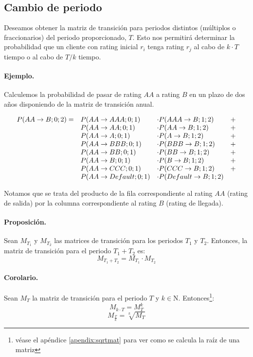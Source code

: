 \subsection{Cambio de periodo}
\label{mtrans:perchange}

Deseamos obtener la matriz de transici\'on para periodos distintos (m\'ultiplos o 
fraccionarios) del periodo proporcionado, $T$. Esto nos permitir\'a determinar la 
probabilidad que un cliente con rating inicial $r_i$ tenga rating $r_j$ al cabo 
de $k \cdot T$ tiempo o al cabo de $T/k$ tiempo.

\paragraph{Ejemplo.} Calculemos la probabilidad de pasar de rating $AA$ a
rating $B$ en un plazo de dos a\~nos disponiendo de la matriz de transici\'on anual.

\begin{displaymath}
\begin{array}{llll}
P(AA \to B;0;2) = & P(AA \to AAA;0;1)     & \cdot P(AAA \to B;1;2)     & + \cr
                  & P(AA \to AA;0;1)      & \cdot P(AA \to B;1;2)      & + \cr
                  & P(AA \to A;0;1)       & \cdot P(A \to B;1;2)       & + \cr
                  & P(AA \to BBB;0;1)     & \cdot P(BBB \to B;1;2)     & + \cr
                  & P(AA \to BB;0;1)      & \cdot P(BB \to B;1;2)      & + \cr
                  & P(AA \to B;0;1)       & \cdot P(B \to B;1;2)       & + \cr
                  & P(AA \to CCC;0;1)     & \cdot P(CCC \to B;1;2)     & + \cr
                  & P(AA \to Default;0;1) & \cdot P(Default \to B;1;2) &
\end{array}
\end{displaymath}

Notamos que se trata del producto de la fila correspondiente al rating $AA$ 
(rating de salida) por la columna correspondiente al rating $B$ (rating de 
llegada).

\paragraph{Proposici\'on.} Sean $M_{T_1}$ y $M_{T_2}$ las matrices de transici\'on
para los periodos $T_1$ y $T_2$. Entonces, la matriz de transici\'on para el
periodo $T_1+T_2$ es:
\begin{equation}
M_{T_1+T_2} = M_{T_1} \cdot M_{T_2}
\end{equation}

\paragraph{Corolario.} Sean $M_{T}$ la matriz de transici\'on para el periodo 
$T$ y $k \in \mathrm{N}$. Entonces\footnote{v\'ease el ap\'endice \ref{apendix:sqrtmat} 
para ver como se calcula la ra\'iz de una matriz}:
\begin{equation}
M_{k \cdot T} = M_{T}^k
\end{equation}
\begin{equation}
M_{\frac{T}{k}} = \sqrt[k]{M_{T}}
\end{equation}


